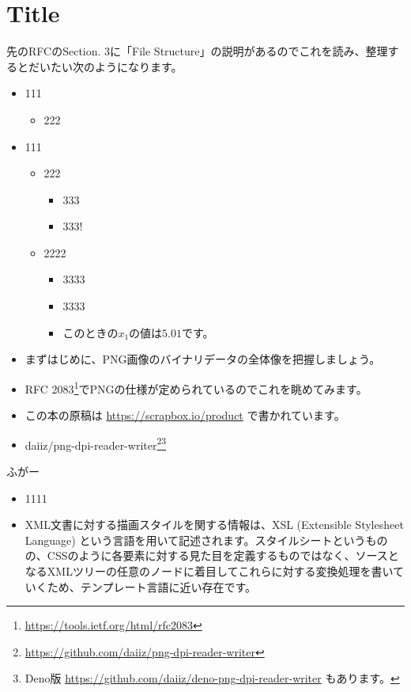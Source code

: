 \section{Title}
先のRFCのSection. 3に「File Structure」の説明があるのでこれを読み、整理するとだいたい次のようになります。
\begin{itemize}
  \item 111
  \begin{itemize}
    \item 222
  \end{itemize}
  \item 111
  \begin{itemize}
    \item 222
    \begin{itemize}
      \item 333
      \item 333!
    \end{itemize}
    \item 2222
    \begin{itemize}
      \item 3333
      \item 3333
      \item このときの$x_1$の値は$5.01$です。
    \end{itemize}
  \end{itemize}
\end{itemize}
\begin{itemize}
  \item まずはじめに、PNG画像のバイナリデータの全体像を把握しましょう。
  \item RFC 2083\footnote{\url{https://tools.ietf.org/html/rfc2083}}でPNGの仕様が定められているのでこれを眺めてみます。
  \item この本の原稿は \url{https://scrapbox.io/product} で書かれています。
  \item daiiz/png-dpi-reader-writer\footnote{\url{https://github.com/daiiz/png-dpi-reader-writer}}\footnote{Deno版 \url{https://github.com/daiiz/deno-png-dpi-reader-writer} もあります。}
\end{itemize}

ふがー
\begin{itemize}
  \item 1111
  \item XML文書に対する描画スタイルを関する情報は、XSL (Extensible Stylesheet Language) という言語を用いて記述されます。スタイルシートというものの、CSSのように各要素に対する見た目を定義するものではなく、ソースとなるXMLツリーの任意のノードに着目してこれらに対する変換処理を書いていくため、テンプレート言語に近い存在です。
\end{itemize}

